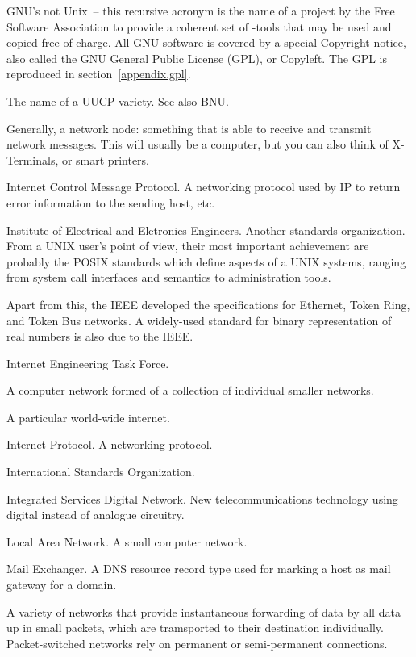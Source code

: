 \documentclass[11pt,makeidx]{report}
\begin{document}
{\begin{dispitems}
\ditem[GNU]
	GNU's not Unix~-- this recursive acronym is the name of a project
	by the Free Software Association to provide a coherent set of
	\unix{}-tools that may be used and copied free of charge. All
	GNU software is covered by a special Copyright notice, also
	called the GNU General Public License (GPL), or Copyleft.
	The GPL is reproduced in section~\ref{appendix.gpl}.

\ditem[HoneyDanBer]
	The name of a UUCP variety. See also BNU.

\ditem[host]
	Generally, a network node: something that is able to receive and
	transmit network messages. This will usually be a computer, but
	you can also think of X-Terminals, or smart printers.

\ditem[ICMP]
        Internet Control Message Protocol. A networking protocol used
        by IP to return error information to the sending host, etc.

\ditem[IEEE]
	Institute of Electrical and Eletronics Engineers. Another standards
	organization. From a UNIX user's point of view, their most
	important achievement are probably the POSIX standards which
	define aspects of a UNIX systems, ranging from system call
	interfaces and semantics to administration tools.

	Apart from this, the IEEE developed the specifications for
	Ethernet, Token Ring, and Token Bus networks. A widely-used
	standard for binary representation of real numbers is also due to
	the IEEE.

\ditem[IETF]
        Internet Engineering Task Force.

\ditem[internet]
	A computer network formed of a collection of individual smaller
	networks.

\ditem[Internet]
	A particular world-wide internet.

\ditem[IP]
        Internet Protocol. A networking protocol.

\ditem[ISO]
	International Standards Organization.

\ditem[ISDN]
	Integrated Services Digital Network. New telecommunications
	technology using digital instead of analogue circuitry.

\ditem[LAN]
	Local Area Network. A small computer network.

\ditem[MX]
        Mail Exchanger. A DNS resource record type used for marking
        a host as mail gateway for a domain.

	A variety of networks that provide instantaneous forwarding
	of data by all data up in small packets, which are tramsported
	to their destination individually. Packet-switched networks
	rely on permanent or semi-permanent connections.


\end{dispitems}}
\end{document}
